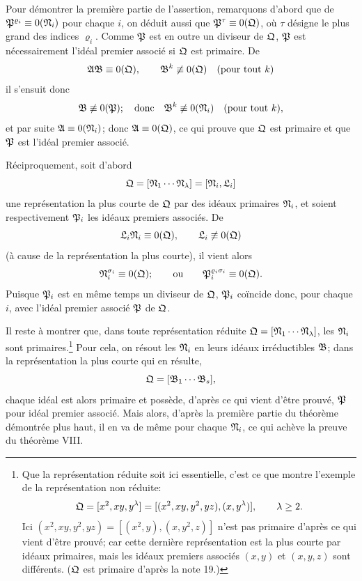 Pour démontrer la première partie de l'assertion, remarquons d'abord que de $\mathfrak{P}^{\varrho_i}\equiv0(\mathfrak{N}_i)$ pour chaque $i$, on déduit aussi que $\mathfrak{P}^\tau\equiv0(\mathfrak{Q})$, où $\tau$ désigne le plus grand des indices $\varrho_i$. Comme $\mathfrak{P}$ est en outre un diviseur de $\mathfrak{Q}$, $\mathfrak{P}$ est nécessairement l'idéal premier associé si $\mathfrak{Q}$ est primaire. De
\[
 \mathfrak{A}\mathfrak{B}\equiv0(\mathfrak{Q}),\qquad
 \mathfrak{B}^k\not\equiv0(\mathfrak{Q})\quad\text{(pour tout }k)
\]
il s'ensuit donc
\[
 \mathfrak{B}\not\equiv0(\mathfrak{P});
 \quad\text{donc}\quad
 \mathfrak{B}^k\not\equiv0(\mathfrak{N}_i)\quad\text{(pour tout }k),
\]
et par suite $\mathfrak{A}\equiv0(\mathfrak{N}_i)$; donc $\mathfrak{A}\equiv0(\mathfrak{Q})$, ce qui prouve que $\mathfrak{Q}$ est primaire et que $\mathfrak{P}$ est l'idéal premier associé.

Réciproquement, soit d'abord
\[
 \mathfrak{Q}=[\mathfrak{N}_1\cdots\mathfrak{N}_\lambda]=[\mathfrak{N}_i,\mathfrak{L}_i]
\]
une représentation la plus courte de $\mathfrak{Q}$ par des idéaux primaires $\mathfrak{N}_i$, et soient respectivement $\mathfrak{P}_i$ les idéaux premiers associés. De
\[
 \mathfrak{L}_i\mathfrak{N}_i\equiv0(\mathfrak{Q}),\qquad
 \mathfrak{L}_i\not\equiv0(\mathfrak{Q})
\]
(à cause de la représentation la plus courte), il vient alors
\[
 \mathfrak{N}_i^{\sigma_i}\equiv0(\mathfrak{Q});
 \qquad\text{ou}\qquad
 \mathfrak{P}_i^{\varrho_i\sigma_i}\equiv0(\mathfrak{Q}).
\]
Puisque $\mathfrak{P}_i$ est en même temps un diviseur de $\mathfrak{Q}$, $\mathfrak{P}_i$ coïncide donc, pour chaque $i$, avec l'idéal premier associé $\mathfrak{P}$ de $\mathfrak{Q}$.

Il reste à montrer que, dans toute représentation réduite $\mathfrak{Q}=[\mathfrak{N}_1\cdots\mathfrak{N}_\lambda]$, les $\mathfrak{N}_i$ sont primaires.\footnote{Que la représentation réduite soit ici essentielle, c'est ce que montre l'exemple de la représentation non réduite:
\[
 \mathfrak{Q}=[x^2,xy,y^\lambda]=[(x^2,xy,y^2,yz),(x,y^\lambda)],
 \qquad \lambda\ge2.
\]
Ici $(x^2,xy,y^2,yz)=[(x^2,y),(x,y^2,z)]$ n'est pas primaire d'après ce qui vient d'être prouvé; car cette dernière représentation est la plus courte par idéaux primaires, mais les idéaux premiers associés $(x,y)$ et $(x,y,z)$ sont différents. ($\mathfrak{Q}$ est primaire d'après la note 19.)} Pour cela, on résout les $\mathfrak{N}_i$ en leurs idéaux irréductibles $\mathfrak{B}$; dans la représentation la plus courte qui en résulte,
\[
 \mathfrak{Q}=[\mathfrak{B}_1\cdots\mathfrak{B}_s],
\]
chaque idéal est alors primaire et possède, d'après ce qui vient d'être prouvé, $\mathfrak{P}$ pour idéal premier associé. Mais alors, d'après la première partie du théorème démontrée plus haut, il en va de même pour chaque $\mathfrak{N}_i$, ce qui achève la preuve du théorème VIII.

